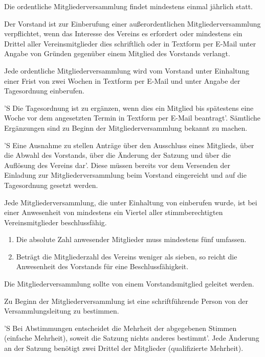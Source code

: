 \documentclass[%
    parskip=half,
]{scrartcl}
\begin{document}
\begin{contract}
Die ordentliche Mitgliederversammlung findet mindestens einmal jährlich statt.

Der Vorstand ist zur Einberufung einer außerordentlichen Mitgliederversammlung verpflichtet, wenn das Interesse des Vereins es erfordert oder mindestens ein Drittel aller Vereinsmitglieder dies schriftlich oder in Textform per E-Mail unter Angabe von Gründen gegenüber einem Mitglied des Vorstands verlangt.\label{p:einberufung}

Jede ordentliche Mitgliederversammlung wird vom Vorstand unter Einhaltung einer Frist von zwei Wochen in Textform per E-Mail und unter Angabe der Tagesordnung einberufen.

'S Die Tagesordnung ist zu ergänzen, wenn dies ein Mitglied bis spätestens eine Woche vor dem angesetzten Termin in Textform per E-Mail beantragt'.
Sämtliche Ergänzungen sind zu Beginn der Mitgliederversammlung bekannt zu machen.\label{p:tagesordnung}

'S Eine Ausnahme zu  stellen Anträge über den Ausschluss eines Mitglieds, über die Abwahl des Vorstands, über die Änderung der Satzung und über die Auflösung des Vereins dar'.
Diese müssen bereits vor dem Versenden der Einladung zur Mitgliederversammlung beim Vorstand eingereicht und auf die Tagesordnung gesetzt werden.

Jede Mitgliederversammlung, die unter Einhaltung von  einberufen wurde, ist bei einer Anwesenheit von mindestens ein Viertel aller stimmberechtigten Vereinsmitglieder beschlussfähig.

\begin{enumerate}[\qquad a)]
    \item Die absolute Zahl anwesender Mitglieder muss mindestens fünf umfassen.
    \item Beträgt die Mitgliederzahl des Vereins weniger als sieben, so reicht die Anwesenheit des Vorstands für eine Beschlussfähigkeit.
\end{enumerate}

Die Mitgliederversammlung sollte von einem Vorstandsmitglied geleitet werden.

Zu Beginn der Mitgliederversammlung ist eine schriftführende Person von der Versammlungsleitung zu bestimmen.

'S Bei Abstimmungen entscheidet die Mehrheit der abgegebenen Stimmen (einfache Mehrheit), soweit die Satzung nichts anderes bestimmt'.
Jede Änderung an der Satzung benötigt zwei Drittel der Mitglieder (qualifizierte Mehrheit).


\end{contract}
\end{document}

